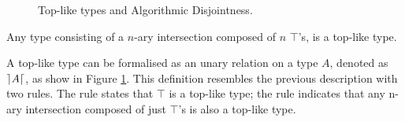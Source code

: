 \begin{figure}[h]


  \caption{Top-like types and Algorithmic Disjointness.}
  \label{fig:tltypesdis}
\end{figure}

\begin{definition}
  Any type consisting of a $n$-ary intersection composed of $n$ $\top$'s, is a top-like type. 
\end{definition}

A top-like type can be formalised as an unary relation on a type $A$, denoted as $\rceil A \lceil$, as show in 
Figure \ref{fig:tltypesdis}.
This definition resembles the previous description with two rules.
The rule  states that $\top$ is a top-like type; 
the rule  indicates that any n-ary intersection composed of just $\top$'s is also a top-like type.




